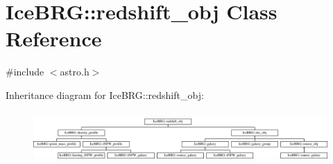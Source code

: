 \hypertarget{classIceBRG_1_1redshift__obj}{}\section{Ice\+B\+R\+G\+:\+:redshift\+\_\+obj Class Reference}
\label{classIceBRG_1_1redshift__obj}


{\ttfamily \#include $<$astro.\+h$>$}

Inheritance diagram for Ice\+B\+R\+G\+:\+:redshift\+\_\+obj\+:\begin{figure}[H]
\begin{center}
\leavevmode
\includegraphics[height=1.975309cm]{classIceBRG_1_1redshift__obj}
\end{center}
\end{figure}
